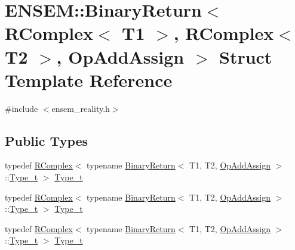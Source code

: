 \hypertarget{structENSEM_1_1BinaryReturn_3_01RComplex_3_01T1_01_4_00_01RComplex_3_01T2_01_4_00_01OpAddAssign_01_4}{}\section{E\+N\+S\+EM\+:\+:Binary\+Return$<$ R\+Complex$<$ T1 $>$, R\+Complex$<$ T2 $>$, Op\+Add\+Assign $>$ Struct Template Reference}
\label{structENSEM_1_1BinaryReturn_3_01RComplex_3_01T1_01_4_00_01RComplex_3_01T2_01_4_00_01OpAddAssign_01_4}


{\ttfamily \#include $<$ensem\+\_\+reality.\+h$>$}

\subsection*{Public Types}
\begin{DoxyCompactItemize}
\item 
typedef \mbox{\hyperlink{classENSEM_1_1RComplex}{R\+Complex}}$<$ typename \mbox{\hyperlink{structENSEM_1_1BinaryReturn}{Binary\+Return}}$<$ T1, T2, \mbox{\hyperlink{structENSEM_1_1OpAddAssign}{Op\+Add\+Assign}} $>$\+::\mbox{\hyperlink{structENSEM_1_1BinaryReturn_3_01RComplex_3_01T1_01_4_00_01RComplex_3_01T2_01_4_00_01OpAddAssign_01_4_a625ad9654ce1681db855c7dbf7816a63}{Type\+\_\+t}} $>$ \mbox{\hyperlink{structENSEM_1_1BinaryReturn_3_01RComplex_3_01T1_01_4_00_01RComplex_3_01T2_01_4_00_01OpAddAssign_01_4_a625ad9654ce1681db855c7dbf7816a63}{Type\+\_\+t}}
\item 
typedef \mbox{\hyperlink{classENSEM_1_1RComplex}{R\+Complex}}$<$ typename \mbox{\hyperlink{structENSEM_1_1BinaryReturn}{Binary\+Return}}$<$ T1, T2, \mbox{\hyperlink{structENSEM_1_1OpAddAssign}{Op\+Add\+Assign}} $>$\+::\mbox{\hyperlink{structENSEM_1_1BinaryReturn_3_01RComplex_3_01T1_01_4_00_01RComplex_3_01T2_01_4_00_01OpAddAssign_01_4_a625ad9654ce1681db855c7dbf7816a63}{Type\+\_\+t}} $>$ \mbox{\hyperlink{structENSEM_1_1BinaryReturn_3_01RComplex_3_01T1_01_4_00_01RComplex_3_01T2_01_4_00_01OpAddAssign_01_4_a625ad9654ce1681db855c7dbf7816a63}{Type\+\_\+t}}
\item 
typedef \mbox{\hyperlink{classENSEM_1_1RComplex}{R\+Complex}}$<$ typename \mbox{\hyperlink{structENSEM_1_1BinaryReturn}{Binary\+Return}}$<$ T1, T2, \mbox{\hyperlink{structENSEM_1_1OpAddAssign}{Op\+Add\+Assign}} $>$\+::\mbox{\hyperlink{structENSEM_1_1BinaryReturn_3_01RComplex_3_01T1_01_4_00_01RComplex_3_01T2_01_4_00_01OpAddAssign_01_4_a625ad9654ce1681db855c7dbf7816a63}{Type\+\_\+t}} $>$ \mbox{\hyperlink{structENSEM_1_1BinaryReturn_3_01RComplex_3_01T1_01_4_00_01RComplex_3_01T2_01_4_00_01OpAddAssign_01_4_a625ad9654ce1681db855c7dbf7816a63}{Type\+\_\+t}}
\end{DoxyCompactItemize}


